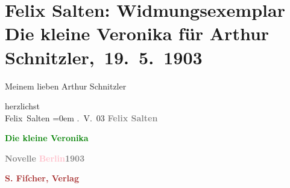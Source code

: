 

\renewcommand{\erwaehnteInstitutionen}{Institutionen: S. Fischer Verlag}
\renewcommand{\erwaehnteOrte}{Orte: Berlin, Wien}
\renewcommand{\erwaehnteWerke}{Werke: Die kleine Veronika}
\section[ Felix Salten: Widmungsexemplar Die kleine Veronika für Arthur Schnitzler, 19. 5. 1903]{Felix Salten: Widmungsexemplar Die kleine Veronika für Arthur
               Schnitzler, 19. 5. 1903}
\nopagebreak{}
\rehead{ }\normalsize\beginnumbering{}
\toendnotes[C]{\smallbreak\pagebreak[2]}
\pstart
           \noindent{}{\pb}Meinem lieben Arthur Schnitzler\pend
           
\pstart
           herzlichst{\\[\baselineskip]}\spacefill\mbox{Felix Salten}\pend
           \leftskip=0em{}
. V. 03\pend
           {\bigskip}
\pstart
           \noindent{}\centering{}\textcolor{gray}{\textbf{Felix Salten}}\pend
           
\pstart
           \noindent{}\centering{}\textcolor{gray}{\textbf{\textcolor{green}{Die kleine Veronika}{}\ledrightnote{\textcolor{green}{Die kleine Veronika}}}}\pend
           
\pstart
           \noindent{}\centering{}\textcolor{gray}{\textbf{Novelle}}\pend
           {\bigskip}
\pstart
           \noindent{}\centering{}\textcolor{gray}{\textbf{\textcolor{pink}{Berlin}{}\ledrightnote{\textcolor{pink}{Berlin}}{ }1903}}\pend
           
\pstart
           \noindent{}\centering{}\textcolor{gray}{\textbf{\textcolor{brown}{S. Fiſcher, Verlag}{}\ledrightnote{\textcolor{brown}{S. Fischer Verlag}}}}\pend
           \endnumbering{}  
      